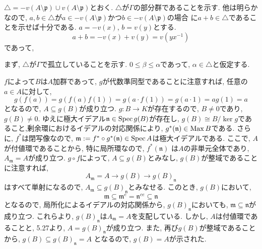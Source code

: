 \documentclass[dvipdfmx]{jsarticle}
\begin{document}
    \begin{problem}
        $\triangle = -v(A \setminus \mathfrak{p}) \cup v(A \setminus \mathfrak{p})$とおく.
        $\triangle$が$\Gamma$の部分群であることを示す.
        他は明らかなので, $a, b \in \triangle$が$a \in -v(A \setminus \mathfrak{p})$かつ$b \in -v(A \setminus \mathfrak{p})$の場合
        に$a + b \in \triangle$であることを示せば十分である.
        $a = -v(x)$, $b = v(y)$とする.
        \[
            a + b = -v(x) + v(y) = v(yx^{-1})
        \]
        であって,

        まず, $\triangle$が$\Gamma$で孤立していることを示す.
        $0 \leq \beta \leq \alpha$であって, $\alpha \in \triangle$と仮定する.
    \end{problem}

    \begin{problem}

    \end{problem}

    \begin{problem}
        $f$によって$B$は$A$加群であって, $g$が代数準同型であることに注意すれば,
        任意の$a \in A$に対して,
        \[
            g(f(a))= g(f(a)f(1)) = g(a\cdot f(1)) = g(a\cdot 1) =ag(1) = a
        \]
        となるので, $A \subseteq g(B)$が成り立つ.
        $g: B \to K$が存在するので, $B \neq 0$であり, $g(B) \neq 0$.
        ゆえに極大イデアル$\mathfrak{n} \in \operatorname{Spec}{g(B)}$が存在し,
        $g(B) \cong B/\ker{g}$であること,剰余環におけるイデアルの対応関係により,
        $g^\ast(\mathfrak{n}) \in \operatorname{Max}{B}$である.
        さらに, $f^\ast$は閉写像なので, $\mathfrak{m} := f^\ast \circ g^\ast(\mathfrak{n}) \in \operatorname{Spec}{A}$は極大イデアルである.
        ここで, $A$が付値環であることから, 特に局所環なので, $f^{\ast}(\mathfrak{n})$
        は$A$の非単元全体であり, $A_\mathfrak{m} = A$が成り立つ.
        $g \circ f$によって, $A \subseteq g(B)$とみなし, $g(B)$が整域であることに注意すれば,
        \[
            A_\mathfrak{m} = A \longrightarrow g(B) \longrightarrow g(B)_\mathfrak{n}
        \]
        はすべて単射になるので, $A_\mathfrak{m} \subseteq g(B)_\mathfrak{n}$とみなせる.
        このとき, $g(B)$において,
        \[
            \mathfrak{m} \subseteq \mathfrak{m}^e = \mathfrak{n}^{ce} \subseteq \mathfrak{n}
        \]
        となるので, 局所化によるイデアルの対応関係から, $g(B)_\mathfrak{n}$においても,
        $\mathfrak{m} \subseteq \mathfrak{n}$が成り立つ.
        これらより, $g(B)_\mathfrak{n}$は$A_\mathfrak{m} = A$を支配している.
        しかし, $A$は付値環であることと, 5.27より, $A = g(B)_\mathfrak{n}$が成り立つ.
        また, 再び$g(B)$が整域であることから, $g(B) \subseteq g(B)_\mathfrak{n} = A$
        となるので, $g(B) = A$が示された.
    \end{problem}
\end{document}
